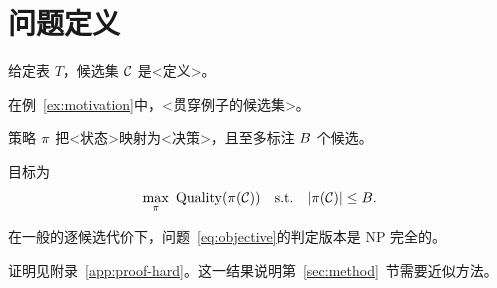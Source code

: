 \section{问题定义}
\label{sec:problem}

\begin{definition}[候选集]
\label{def:candidate}
给定表 $T$，候选集 $\mathcal{C}$ 是<定义>。
\end{definition}

\begin{example}
\label{ex:candidate}
在例~\ref{ex:motivation}中，<贯穿例子的候选集>。
\end{example}

\begin{definition}[标注策略]
\label{def:policy}
策略 $\pi$ 把<状态>映射为<决策>，且至多标注 $B$ 个候选。
\end{definition}

目标为
\begin{equation}
\label{eq:objective}
\max_{\pi}\ \mathrm{Quality}(\pi(\mathcal{C})) \quad \text{s.t.} \quad |\pi(\mathcal{C})| \le B .
\end{equation}

\begin{theorem}[困难性]
\label{thm:hard}
在一般的逐候选代价下，问题~\eqref{eq:objective}的判定版本是 NP 完全的。
\end{theorem}
证明见附录~\ref{app:proof-hard}。这一结果说明第~\ref{sec:method}~节需要近似方法。
